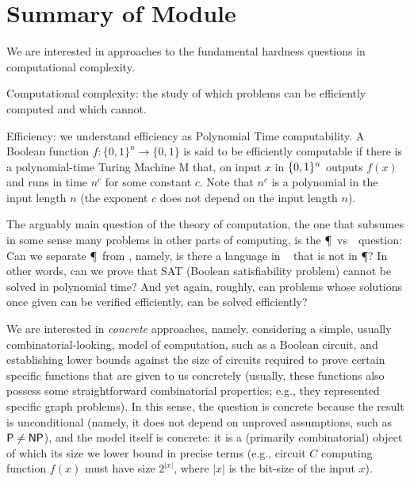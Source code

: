 %
%  
%
%





\section{Summary of Module}
\label{sec:1}

 We are interested in approaches to the fundamental hardness questions in computational complexity.

Computational complexity: the study of which problems can be efficiently computed and which cannot.

Efficiency: we understand efficiency as Polynomial Time computability. A Boolean function $f:\{0,1\}^n\to\{0,1\}$ is said to be efficiently computable if there is a polynomial-time Turing Machine M that, on input $x$ in $\{0,1\}^n$ outputs $f(x)$ and runs in time $n^c$ for some constant $c$. Note that $n^c$ is a polynomial in the input length $n$ (the exponent $c$ does not depend on the input length $n$). 

The arguably main question of the theory of computation, the one that subsumes in some sense many problems in other parts of computing,  is the \P~vs~\NP~question: Can we separate \P~from \NP, namely, is there a language in \NP~ that is not in \P? In other words, can we prove that SAT (Boolean satisfiability problem) cannot be solved in polynomial time? And yet again, roughly, can problems whose solutions once given can be verified efficiently, can be solved efficiently? 

We are interested in \emph{concrete} approaches, namely, considering a simple, usually combinatorial-looking, model of computation, such as a Boolean circuit, and establishing lower bounds against the size of circuits required to prove certain specific functions that are given to us concretely (usually, these functions also possess some straightforward combinatorial 
properties; e.g., they represented specific graph problems). In this sense, the question is concrete because the result is unconditional (namely, it does not depend on unproved 
assumptions, such as ${\mathsf{P}}\neq{\ensuremath{\mathsf{NP}}}$), and the model itself is concrete: it is a (primarily combinatorial) object of which its size we lower 
bound in precise terms (e.g., circuit $C$ computing function $f(x)$ must have size $2^{|x|}$, where $|x|$ is the bit-size of the input $x$).
\medskip 

